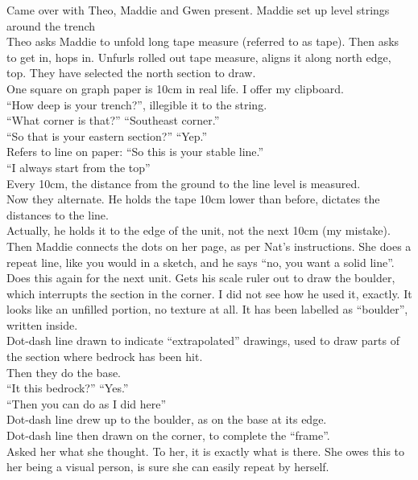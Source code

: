 \documentclass[
]{article}
\begin{document}
Came over with Theo, Maddie and Gwen present. Maddie set up level
strings around the trench\\
Theo asks Maddie to unfold long tape measure (referred to as tape). Then
asks to get in, hops in. Unfurls rolled out tape measure, aligns it
along north edge, top. They have selected the north section to draw.\\
One square on graph paper is 10cm in real life. I offer my clipboard.\\
``How deep is your trench?'', illegible it to the string.\\
``What corner is that?'' ``Southeast corner.''\\
``So that is your eastern section?'' ``Yep.''\\
Refers to line on paper: ``So this is your stable line.''\\
``I always start from the top''\\
Every 10cm, the distance from the ground to the line level is
measured.\\
Now they alternate. He holds the tape 10cm lower than before, dictates
the distances to the line.\\
Actually, he holds it to the edge of the unit, not the next 10cm (my
mistake).\\
Then Maddie connects the dots on her page, as per Nat's instructions.
She does a repeat line, like you would in a sketch, and he says ``no,
you want a solid line''.\\
Does this again for the next unit. Gets his scale ruler out to draw the
boulder, which interrupts the section in the corner. I did not see how
he used it, exactly. It looks like an unfilled portion, no texture at
all. It has been labelled as ``boulder'', written inside.\\
Dot-dash line drawn to indicate ``extrapolated'' drawings, used to draw
parts of the section where bedrock has been hit.\\
Then they do the base.\\
``It this bedrock?'' ``Yes.''\\
``Then you can do as I did here''\\
Dot-dash line drew up to the boulder, as on the base at its edge.\\
Dot-dash line then drawn on the corner, to complete the ``frame''.\\
Asked her what she thought. To her, it is exactly what is there. She
owes this to her being a visual person, is sure she can easily repeat by
herself.\\
\end{document}
